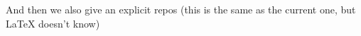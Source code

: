 \documentclass[minimal]{omdoc}
\begin{document}
And then we also give an explicit repos (this is the same as  the current one, but {\LaTeX}
doesn't know)

\end{document}

